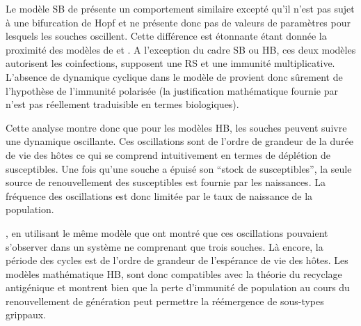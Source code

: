 Le modèle SB de \cite{Gog2002a} présente un comportement similaire
excepté qu'il n'est pas sujet à une bifurcation de Hopf et ne présente
donc pas de valeurs de paramètres pour lesquels les souches oscillent.
Cette différence est étonnante étant donnée la proximité des modèles
de \cite{Gog2002a} et \cite{Gomes2002}. A l'exception du cadre SB ou
HB, ces deux modèles autorisent les coinfections, supposent une RS et
une immunité multiplicative. L'absence de dynamique cyclique dans le
modèle de \cite{Gog2002a} provient donc sûrement de l'hypothèse de
l'immunité polarisée (la justification mathématique fournie par
\cite{Dawes2002} n'est pas réellement traduisible en termes
biologiques).

Cette analyse montre donc que pour les modèles HB, les souches peuvent
suivre une dynamique oscillante. Ces oscillations sont de l'ordre de
grandeur de la durée de vie des hôtes ce qui se comprend intuitivement
en termes de déplétion de susceptibles. Une fois qu'une souche a
épuisé son ``stock de susceptibles'', la seule source de
renouvellement des susceptibles est fournie par les naissances. La
fréquence des oscillations est donc limitée par le taux de naissance
de la population.

\citet{Lin1999}, en utilisant le même modèle que \citet{Andreasen1997}
ont montré que ces oscillations pouvaient s'observer dans un système
ne comprenant que trois souches. Là encore, la période des cycles est
de l'ordre de grandeur de l'espérance de vie des hôtes.  Les modèles
mathématique HB, sont donc compatibles avec la théorie du recyclage
antigénique et montrent bien que la perte d'immunité de population au
cours du renouvellement de génération peut permettre la réémergence de
sous-types grippaux.

\vspace{1cm}

